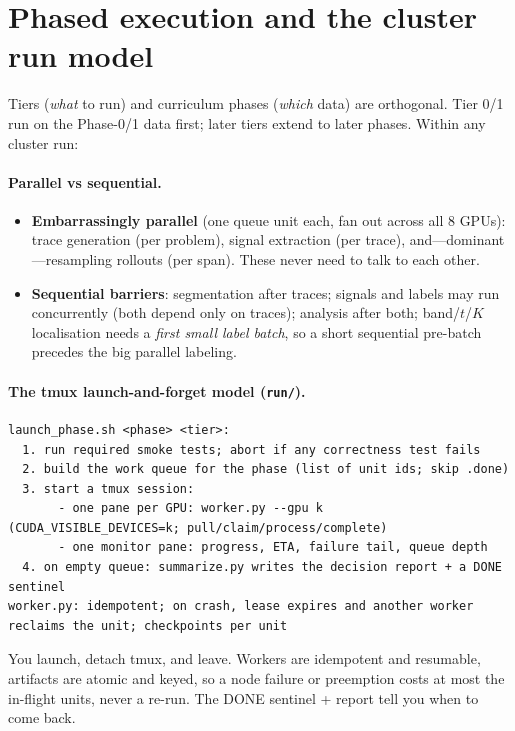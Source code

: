 \documentclass[11pt]{article}
\begin{document}
\section{Phased execution and the cluster run model}
\label{sec:phases}
Tiers (\emph{what} to run) and curriculum phases (\emph{which} data) are orthogonal. Tier 0/1 run on the
Phase-0/1 data first; later tiers extend to later phases. Within any cluster run:

\paragraph{Parallel vs sequential.}
\begin{itemize}
\item \textbf{Embarrassingly parallel} (one queue unit each, fan out across all 8 GPUs): trace generation
(per problem), signal extraction (per trace), and---dominant---resampling rollouts (per span). These
never need to talk to each other.
\item \textbf{Sequential barriers}: segmentation after traces; signals and labels may run concurrently
(both depend only on traces); analysis after both; band/$t$/$K$ localisation needs a \emph{first small
label batch}, so a short sequential pre-batch precedes the big parallel labeling.
\end{itemize}

\paragraph{The tmux launch-and-forget model (\texttt{run/}).}
\begin{lstlisting}
launch_phase.sh <phase> <tier>:
  1. run required smoke tests; abort if any correctness test fails
  2. build the work queue for the phase (list of unit ids; skip .done)
  3. start a tmux session:
       - one pane per GPU: worker.py --gpu k   (CUDA_VISIBLE_DEVICES=k; pull/claim/process/complete)
       - one monitor pane: progress, ETA, failure tail, queue depth
  4. on empty queue: summarize.py writes the decision report + a DONE sentinel
worker.py: idempotent; on crash, lease expires and another worker reclaims the unit; checkpoints per unit
\end{lstlisting}
You launch, detach tmux, and leave. Workers are idempotent and resumable, artifacts are atomic and keyed,
so a node failure or preemption costs at most the in-flight units, never a re-run. The DONE sentinel +
report tell you when to come back.
\end{document}
